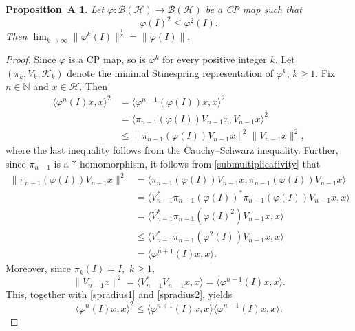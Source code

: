 \documentclass[10pt, a4paper, oneside, reqno]{amsproc}
\numberwithin{equation}{section}
\newtheorem*{PropA}{\bf Proposition~A}
\theoremstyle{remark}
\theoremstyle{definition}
\newcommand*{\Ge}{\geqslant}
\newcommand*{\Le}{\leqslant}
\begin{document}
\begin{PropA} 
Let $\varphi:\mathcal{B}(\mathcal H) \to \mathcal{B}(\mathcal H)$ be a CP map such that 
\begin{equation} \label{submultiplicativity}
\varphi(I)^2 \Le \varphi^2(I). 
\end{equation}
Then $\displaystyle \lim_{k \to \infty} \|\varphi^k(I)\|^{\frac{1}{k}}=\|\varphi(I)\|.$
\end{PropA}
\begin{proof}
Since $\varphi$ is a CP map, so is $\varphi^k$ for every positive integer $k$. Let $(\pi_k, V_k, \mathcal K_k)$ denote the minimal Stinespring representation of $\varphi^k$, $k \Ge 1$. Fix $n \in \mathbb N$ and $x \in \mathcal H$. Then
	\begin{align}\label{spradius1}
	\nonumber\langle \varphi^n(I)x, x \rangle^2 &=\langle \varphi^{n-1}(\varphi(I))x,x\rangle^2\\ \nonumber 
&=\langle \pi_{n-1}(\varphi(I))V_{n-1}x,V_{n-1}x\rangle^2\\ &\Le \|\pi_{n-1}(\varphi(I)) V_{n-1} x\|^2 \| V_{n-1} x\|^2,
	\end{align}
where the last inequality follows from the Cauchy--Schwarz inequality. 
Further, since
$\pi_{n-1}$ is a $*$-homomorphism, it follows from
\eqref{submultiplicativity} that
\begin{align}\label{spradius2}
	\nonumber\|\pi_{n-1}(\varphi(I)) V_{n-1} x\|^2 
&=\langle \pi_{n-1}(\varphi(I)) V_{n-1} x,\pi_{n-1}(\varphi(I)) V_{n-1} x \rangle  \\& \nonumber = \langle V^*_{n-1}\pi_{n-1}(\varphi(I))^*\pi_{n-1}(\varphi(I)) V_{n-1} x, x\rangle 
\\& \nonumber = \langle V^*_{n-1}\pi_{n-1}(\varphi(I)^2) V_{n-1} x, x\rangle 
\\
&\Le \nonumber \langle V^*_{n-1}\pi_{n-1}(\varphi^2(I))V_{n-1}x,x\rangle \\&= \langle \varphi^{n+1}(I)
	x,x\rangle. \end{align} 
Moreover, since $\pi_k(I)=I,$ $k \Ge 1$, 
$$\|V_{n-1}x\|^2=\langle V^*_{n-1}V_{n-1}x,x\rangle = \langle \varphi^{n-1}(I)x,x\rangle.$$ 
This, together with \eqref{spradius1} and \eqref{spradius2}, yields
	\begin{equation*}
	\langle \varphi^n(I)x, x \rangle^2 \Le \langle \varphi^{n+1}(I)x, x \rangle \langle \varphi^{n-1}(I)x, x \rangle. \end{equation*}

\end{proof}
\end{document}
